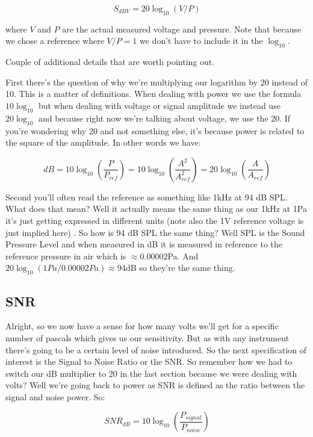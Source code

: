 \documentclass[12pt,a6paper]{book}
\begin{document}
\begin{equation}
S_{dBV} = 20 \log_{10}(V/P)
\end{equation}

where $V$ and $P$ are the actual measured voltage and pressure. Note that because we chose a reference where $V/P=1$ we don't have to include it in the $\log_{10}$. 

Couple of additional details that are worth pointing out. 

First there's the question of why we're multiplying our logarithm by 20 instead of 10. This is a matter of definitions. When dealing with power we use the formula $10 \log_{10}$ but when dealing with voltage or signal amplitude we instead use $20 \log_{10}$ and because right now we're talking about voltage, we use the 20. If you're wondering why 20 and not something else, it's because power is related to the square of the amplitude. In other words we have:

\begin{equation}
dB = 10 \log_{10}(\frac{P}{P_{ref}})=10 \log_{10}(\frac{A^2}{A^2_{ref}})=20 \log_{10} (\frac{A}{A_{ref}})
\end{equation}

Second you'll often read the reference as something like 1kHz at 94 dB SPL. What does that mean? Well it actually means the same thing as our 1kHz at 1Pa it's just getting expressed in different units (note also the 1V reference voltage is just implied here) \cite{rdunn}. So how is 94 dB SPL the same thing? Well SPL is the Sound Pressure Level and when measured in dB it is measured in reference to the reference pressure in air which is $\approx 0.00002$Pa. And $20 \log_{10}(1Pa/0.00002Pa)\approx 94$dB so they're the same thing. 

\subsection{SNR}
Alright, so we now have a sense for how many volts we'll get for a specific number of pascals which gives us our sensitivity. But as with any instrument there's going to be a certain level of noise introduced. So the next specification of interest is the Signal to Noise Ratio or the SNR. So remember how we had to switch our dB multiplier to 20 in the last section because we were dealing with volts? Well we're going back to power as SNR is defined as the ratio between the signal and noise power. So:

\begin{equation}
SNR_{dB}=10 \log_{10}(\frac{P_{signal}}{P_{noise}})
\end{equation}
\end{document}
